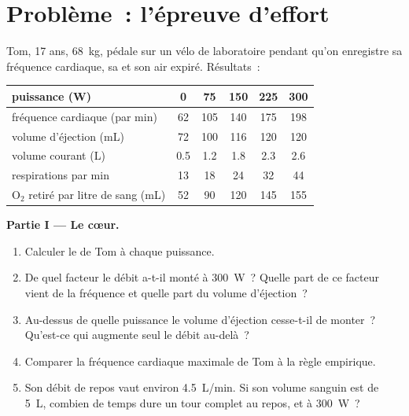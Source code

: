 \section{Problème~: l'épreuve d'effort}

\begin{problem}
\label{pb:g10:heart-lungs-effort:1}
Tom, 17 ans, \qty{68}{kg}, pédale sur un vélo de laboratoire pendant
qu'on enregistre sa fréquence cardiaque, sa  et son air
expiré. Résultats~:

\begin{center}
\begin{tabular}{lccccc}
puissance (W) & 0 & 75 & 150 & 225 & 300 \\ \hline
fréquence cardiaque (par min) & 62 & 105 & 140 & 175 & 198 \\
volume d'éjection (mL) & 72 & 100 & 116 & 120 & 120 \\
volume courant (L) & 0.5 & 1.2 & 1.8 & 2.3 & 2.6 \\
respirations par min & 13 & 18 & 24 & 32 & 44 \\
$\mathrm{O_2}$ retiré par litre de sang (mL) & 52 & 90 & 120 & 145 & 155 \\
\end{tabular}
\end{center}

\medskip
\noindent\textbf{Partie I --- Le cœur.}
\begin{enumerate}
  \item Calculer le  de Tom à chaque puissance.
  \item De quel facteur le débit a-t-il monté à \qty{300}{W}~? Quelle
        part de ce facteur vient de la fréquence et quelle part du
        volume d'éjection~?
  \item Au-dessus de quelle puissance le volume d'éjection cesse-t-il
        de monter~? Qu'est-ce qui augmente seul le débit au-delà~?
  \item Comparer la fréquence cardiaque maximale de Tom à la règle
        empirique.
  \item Son débit de repos vaut environ \qty{4.5}{L/min}. Si son volume
        sanguin est de \qty{5}{L}, combien de temps dure un tour
        complet au repos, et à \qty{300}{W}~?
\end{enumerate}


\end{problem}
